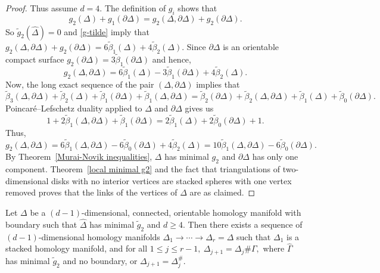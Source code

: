 \documentclass[ALCO,ThmDefs,Unicode,epreuves]{cedram}
\newcommand{\complet}[1]{\hat{#1}}
\begin{document}
\begin{proof}
 Thus assume $d=4.$ The definition of $g_i$ shows that 
 \[
 g_2(\Delta) + g_1(\partial \Delta) = g_2(\Delta, \partial \Delta) + g_2(\partial \Delta).
 \]
 So $\tilde{g}_2(\complet{\Delta})=0$ and \eqref{g-tilde} imply that $g_2(\Delta, \partial \Delta) + g_2(\partial \Delta) = 6 \tilde{\beta}_1(\Delta) + 4 \tilde{\beta}_2(\Delta).$ Since $\partial \Delta$ is an orientable compact surface $g_2(\partial \Delta)= 3 \tilde{\beta}_1(\partial \Delta)$ and hence,
 \[
 g_2(\Delta, \partial \Delta) = 6 \tilde{\beta}_1(\Delta) - 3 \tilde{\beta}_1(\partial \Delta)+ 4 \tilde{\beta}_2(\Delta).
 \]
 Now, the long exact sequence of the pair $(\Delta, \partial \Delta)$ implies that 
 \[
 \tilde{\beta}_3(\Delta, \partial \Delta) + \tilde{\beta}_2(\Delta) + \tilde{\beta}_1(\partial \Delta) + \tilde{\beta}_1(\Delta, \partial \Delta) = \tilde{\beta}_2(\partial \Delta) + \tilde{\beta}_2(\Delta, \partial \Delta)+ \tilde{\beta}_1(\Delta) + \tilde{\beta}_0(\partial \Delta).
 \]
 Poincar{\'e}--Lefschetz duality applied to $\Delta$ and $\partial \Delta$ gives us
 \[
 1 + 2 \tilde{\beta}_1(\Delta, \partial \Delta) + \tilde{\beta}_1(\partial \Delta) = 2 \tilde{\beta}_1(\Delta) + 2 \tilde{\beta}_0 (\partial \Delta) + 1.
 \]
 Thus,
 \[
 g_2(\Delta, \partial \Delta) = 6 \tilde{\beta}_1(\Delta, \partial \Delta) - 6 \tilde{\beta}_0(\partial \Delta) + 4 \tilde{\beta}_2(\Delta) = 10 \tilde{\beta}_1(\Delta, \partial \Delta) - 6 \tilde{\beta}_0(\partial \Delta).
 \]
By Theorem~\ref{Murai-Novik inequalities}, $\Delta$ has minimal $g_2$ and $\partial \Delta$ has only one component. Theorem~\ref{local minimal g2} and the fact that triangulations of two-dimensional disks with no interior vertices are stacked spheres with one vertex removed proves that the links of the vertices of $\Delta$ are as claimed. 
 \end{proof}
 
 
 \begin{theorem} \label{minimal-tilde-g}
 Let $\Delta$ be a $(d-1)$-dimensional, connected, orientable homology manifold with boundary such that $\complet{\Delta}$ has minimal $\tilde{g}_2$ and $d \ge 4.$ Then there exists a sequence of $(d-1)$-dimensional homology manifolds $\Delta_1 \longrightarrow \cdots \longrightarrow \Delta_r=\Delta$ such that $\Delta_1$ is a stacked homology manifold, and for all $1 \le j \le r-1,~\Delta_{j+1} = \Delta_j \# \Gamma,$ where $\complet{\Gamma}$ has minimal $\tilde{g}_2$ and no boundary, or $\Delta_{j+1} = \Delta^\#_j.$ 
 \end{theorem}
 
\end{document}

